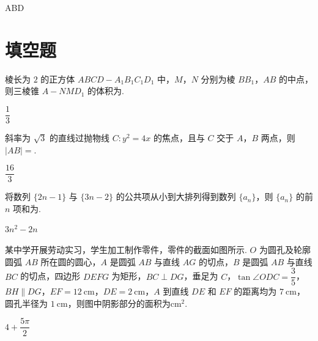\begin{answer}
    ABD
\end{answer}

\section{填空题}

\begin{problem}
棱长为 \(2\) 的正方体 \(ABCD-A_1B_1C_1D_1\) 中，\(M\)，\(N\) 分别为棱 \(BB_1\)，\(AB\) 的中点，则三棱锥 \(A-NMD_1\) 的体积为\fillinblank{}.
\end{problem}

\begin{answer}
    \(\dfrac13\)
\end{answer}

\begin{problem}
斜率为 \(\sqrt3\) 的直线过抛物线 \(C:y^2=4x\) 的焦点，且与 \(C\) 交于 \(A\)，\(B\) 两点，则 \(|AB|=\)\fillinblank{}.
\end{problem}

\begin{answer}
    \(\dfrac{16}{3}\)
\end{answer}

\begin{problem}
将数列 \(\{2n-1\}\) 与 \(\{3n-2\}\) 的公共项从小到大排列得到数列 \(\{a_n\}\)，则 \(\{a_n\}\) 的前 \(n\) 项和为\fillinblank{}.
\end{problem}

\begin{answer}
    \(3n^2-2n\)
\end{answer}

\begin{problem}
某中学开展劳动实习，学生加工制作零件，零件的截面如图所示. \(O\) 为圆孔及轮廓圆弧 \(AB\) 所在圆的圆心，\(A\) 是圆弧 \(AB\) 与直线 \(AG\) 的切点，\(B\) 是圆弧 \(AB\) 与直线 \(BC\) 的切点，四边形 \(DEFG\) 为矩形，\(BC\perp DG\)，垂足为 \(C\)，\(\tan\angle ODC=\dfrac35\)，\(BH\parallel DG\)，\(EF=12 \mathrm{~cm}\)，\(DE=2 \mathrm{~cm}\)，\(A\) 到直线 \(DE\) 和 \(EF\) 的距离均为 \(7 \mathrm{~cm}\)，圆孔半径为 \(1 \mathrm{~cm}\)，则图中阴影部分的面积为\fillinblank{}\(\mathrm{cm}^2\).

\begin{center}
\end{center}
\end{problem}

\begin{answer}
    \(4+\dfrac{5\pi}{2}\)
\end{answer}


